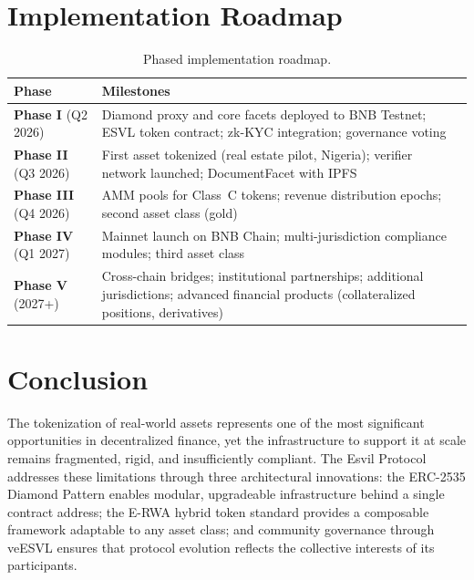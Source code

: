 \documentclass[11pt,a4paper]{article}
\begin{document}
\section{Implementation Roadmap}
\label{sec:roadmap}

\begin{table}[H]
\centering
\caption{Phased implementation roadmap.}
\begin{tabularx}{\textwidth}{lX}
\toprule
\textbf{Phase} & \textbf{Milestones} \\
\midrule
\textbf{Phase I} (Q2 2026) & Diamond proxy and core facets deployed to BNB Testnet; ESVL token contract; zk-KYC integration; governance voting \\
\textbf{Phase II} (Q3 2026) & First asset tokenized (real estate pilot, Nigeria); verifier network launched; DocumentFacet with IPFS \\
\textbf{Phase III} (Q4 2026) & AMM pools for Class~C tokens; revenue distribution epochs; second asset class (gold) \\
\textbf{Phase IV} (Q1 2027) & Mainnet launch on BNB Chain; multi-jurisdiction compliance modules; third asset class \\
\textbf{Phase V} (2027+) & Cross-chain bridges; institutional partnerships; additional jurisdictions; advanced financial products (collateralized positions, derivatives) \\
\bottomrule
\end{tabularx}
\end{table}

\section{Conclusion}
\label{sec:conclusion}

The tokenization of real-world assets represents one of the most significant opportunities in decentralized finance, yet the infrastructure to support it at scale remains fragmented, rigid, and insufficiently compliant. The Esvil Protocol addresses these limitations through three architectural innovations: the ERC-2535 Diamond Pattern enables modular, upgradeable infrastructure behind a single contract address; the E-RWA hybrid token standard provides a composable framework adaptable to any asset class; and community governance through veESVL ensures that protocol evolution reflects the collective interests of its participants.
\end{document}
